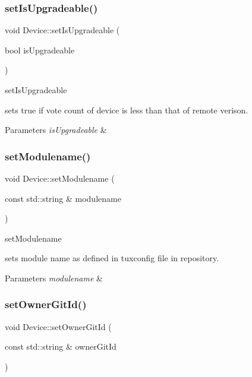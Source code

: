 \subsubsection{\texorpdfstring{set\+Is\+Upgradeable()}{setIsUpgradeable()}}
{\footnotesize\ttfamily void Device\+::set\+Is\+Upgradeable (\begin{DoxyParamCaption}\item[{bool}]{is\+Upgradeable }\end{DoxyParamCaption})\hspace{0.3cm}{\ttfamily [inline]}}



set\+Is\+Upgradeable 

sets true if vote count of device is less than that of remote verison. 
\begin{DoxyParams}{Parameters}
{\em is\+Upgradeable} & \\
\hline
\end{DoxyParams}
\mbox{\label{classDevice_a09e9d9bbcfa76268b7ebc30afa680c69}} 
\subsubsection{\texorpdfstring{set\+Modulename()}{setModulename()}}
{\footnotesize\ttfamily void Device\+::set\+Modulename (\begin{DoxyParamCaption}\item[{const std\+::string \&}]{modulename }\end{DoxyParamCaption})}



set\+Modulename 

sets module name as defined in tuxconfig file in repository. 
\begin{DoxyParams}{Parameters}
{\em modulename} & \\
\hline
\end{DoxyParams}
\mbox{\label{classDevice_aabc16749d0fe22ec25ca525fbd2b9dc2}} 
\subsubsection{\texorpdfstring{set\+Owner\+Git\+Id()}{setOwnerGitId()}}
{\footnotesize\ttfamily void Device\+::set\+Owner\+Git\+Id (\begin{DoxyParamCaption}\item[{const std\+::string \&}]{owner\+Git\+Id }\end{DoxyParamCaption})}



